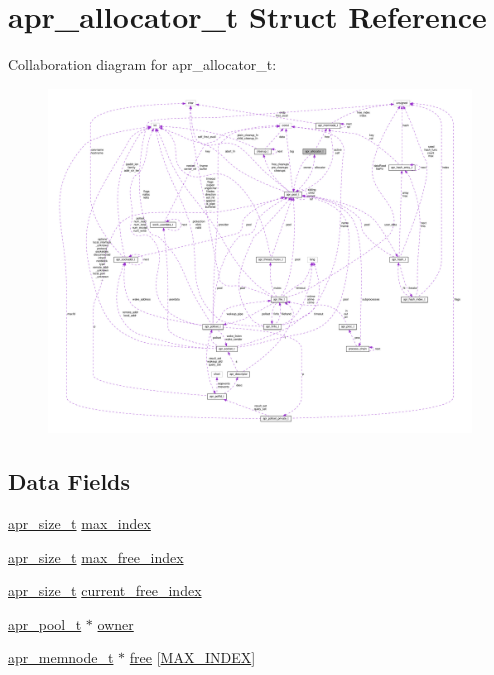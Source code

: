 \hypertarget{structapr__allocator__t}{}\section{apr\+\_\+allocator\+\_\+t Struct Reference}
\label{structapr__allocator__t}


Collaboration diagram for apr\+\_\+allocator\+\_\+t\+:
\nopagebreak
\begin{figure}[H]
\begin{center}
\leavevmode
\includegraphics[width=350pt]{structapr__allocator__t__coll__graph}
\end{center}
\end{figure}
\subsection*{Data Fields}
\begin{DoxyCompactItemize}
\item 
\hyperlink{group__apr__platform_gaaa72b2253f6f3032cefea5712a27540e}{apr\+\_\+size\+\_\+t} \hyperlink{structapr__allocator__t_a511a854b12091221d19bf4e02178b517}{max\+\_\+index}
\item 
\hyperlink{group__apr__platform_gaaa72b2253f6f3032cefea5712a27540e}{apr\+\_\+size\+\_\+t} \hyperlink{structapr__allocator__t_a78b567956079277c86dd728c824795d8}{max\+\_\+free\+\_\+index}
\item 
\hyperlink{group__apr__platform_gaaa72b2253f6f3032cefea5712a27540e}{apr\+\_\+size\+\_\+t} \hyperlink{structapr__allocator__t_a57c23a44f7748c9c5e7ac12ed7425f85}{current\+\_\+free\+\_\+index}
\item 
\hyperlink{structapr__pool__t}{apr\+\_\+pool\+\_\+t} $\ast$ \hyperlink{structapr__allocator__t_a7765c4164197b52893dc4523e3104429}{owner}
\item 
\hyperlink{structapr__memnode__t}{apr\+\_\+memnode\+\_\+t} $\ast$ \hyperlink{structapr__allocator__t_a6c86698519a9474b32cc2d3c89aa1222}{free} \mbox{[}\hyperlink{apr__pools_8c_aded4012e77ec37914723bec40a225e46}{M\+A\+X\+\_\+\+I\+N\+D\+EX}\mbox{]}
\end{DoxyCompactItemize}


